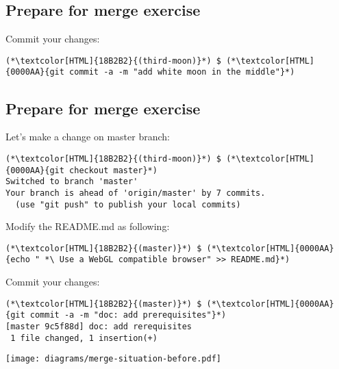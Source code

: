 \subsection{Prepare for merge exercise}
\begin{frame}[fragile]
  \subslidetitle

  Commit your changes:
  \begin{lstlisting}
(*\textcolor[HTML]{18B2B2}{(third-moon)}*) $ (*\textcolor[HTML]{0000AA}{git commit -a -m "add white moon in the middle"}*)
\end{lstlisting}

\end{frame}


\subsection{Prepare for merge exercise}
\begin{frame}[fragile]
  \subslidetitle

  Let's make a change on master branch:
  \begin{lstlisting}
(*\textcolor[HTML]{18B2B2}{(third-moon)}*) $ (*\textcolor[HTML]{0000AA}{git checkout master}*)
Switched to branch 'master'
Your branch is ahead of 'origin/master' by 7 commits.
  (use "git push" to publish your local commits)
\end{lstlisting}

  Modify the README.md as following:
  \begin{lstlisting}
(*\textcolor[HTML]{18B2B2}{(master)}*) $ (*\textcolor[HTML]{0000AA}{echo " *\ Use a WebGL compatible browser" >> README.md}*)
\end{lstlisting}

  Commit your changes:
  \begin{lstlisting}
(*\textcolor[HTML]{18B2B2}{(master)}*) $ (*\textcolor[HTML]{0000AA}{git commit -a -m "doc: add prerequisites"}*)
[master 9c5f88d] doc: add rerequisites
 1 file changed, 1 insertion(+)
\end{lstlisting}

  \centerline{\texttt{[image: diagrams/merge-situation-before.pdf]}}

\end{frame}

